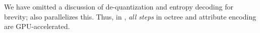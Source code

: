 We have omitted a discussion of de-quantization and entropy decoding for brevity; \gsnfs{} also parallelizes this.
%
Thus, in \gsnfs{}, \textit{all steps} in octree and attribute encoding are GPU-accelerated.
%









